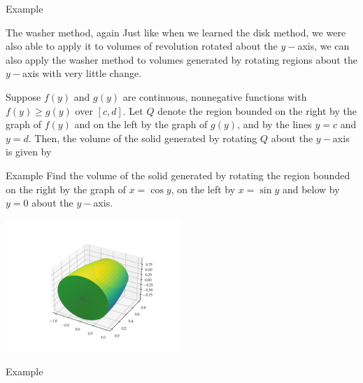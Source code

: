\documentclass[presentation]{beamer}
\begin{document}
\begin{frame}[label={sec:org8850210}]{Example}
\end{frame}

\begin{frame}[label={sec:org969c024}]{The washer method, again}
Just like when we learned the disk method, we were also able to apply
it to volumes of revolution rotated about the \(y-\)axis, we can also
apply the washer method to volumes generated by rotating regions about
the \(y-\)axis with very little change.
\begin{theorem}
Suppose \(f \left( y \right)\) and \(g \left( y \right)\) are
continuous, nonnegative functions with \(f \left( y \right) \ge g
\left( y \right)\) over \(\left[ c,d \right]\).  Let \(Q\) denote
the region bounded on the right by the graph of \(f \left( y \right)\) and
on the left by the graph of \(g \left( y \right)\), and by the lines \(y=c\) and \(y=d\).  Then, the volume of the solid generated by rotating
\(Q\) about the \(y-\)axis is given by
\[
 \]
 \phantom{butts}

\phantom{butts}
\end{theorem}
\end{frame}

\begin{frame}[label={sec:org3d1510c}]{Example}
Find the volume of the solid generated by rotating the region bounded
on the right by the graph of \(x = \cos y\), on the left by \(x =
\sin y\) and below by \(y = 0\) about the \(y-\)axis.

\begin{center}
\includegraphics[width=0.5\textwidth]{../img/day007-ex04.png}
\end{center}
\vspace{10in}
\end{frame}

\begin{frame}[label={sec:org3c0e00e}]{Example}
\end{frame}
\end{document}
